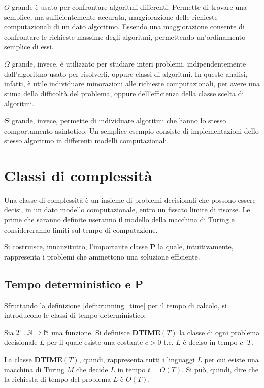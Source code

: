 $O$ grande è usato per confrontare algoritmi differenti.
Permette di trovare una semplice, ma sufficientemente accurata, maggiorazione delle richieste computazionali di un dato algoritmo. 
Essendo una maggiorazione consente di confrontare le richieste massime degli algoritmi, permettendo un'ordinamento semplice di essi.

$\Omega$ grande, invece, è utilizzato per studiare interi problemi, indipendentemente dall'algoritmo usato per risolverli, oppure classi di algoritmi.
In queste analisi, infatti, è utile individuare minorazioni alle richieste computazionali, per avere una stima della difficoltà del problema, oppure dell'efficienza della classe scelta di algoritmi.

$\Theta$ grande, invece, permette di individuare algoritmi che hanno lo stesso comportamento asintotico.
Un semplice esempio consiste di implementazioni dello stesso algoritmo in differenti modelli computazionali.

\section{Classi di complessità}
Una classe di complessità è un insieme di problemi decisionali che possono essere decisi, in un dato modello computazionale, entro un fissato limite di risorse.
Le prime che saranno definite useranno il modello della macchina di Turing e considereranno limiti sul tempo di computazione.

Si costruisce, innanzitutto, l'importante classe \textbf{P} la quale, intuitivamente, rappresenta i problemi che ammettono una soluzione efficiente.
\subsection{Tempo deterministico e P}
Sfruttando la definizione \ref{defn:running_time} per il tempo di calcolo, si introducono le classi di tempo deterministico:
\begin{defn}\label{defn:DTIME}
 Sia $T: \mathbb{N} \to \mathbb{N}$ una funzione.
 Si definisce \textbf{DTIME}$(T)$ la classe di ogni problema decisionale $L$ per il quale esiste una costante $c > 0$ t.c. $L$ è deciso in tempo $c \cdot T$.
\end{defn}
La classe \textbf{DTIME}$(T)$, quindi, rappresenta tutti i linguaggi $L$ per cui esiste una macchina di Turing $M$ che decide $L$ in tempo $t = O(T)$. Si può, quindi, dire che la richiesta di tempo del problema $L$ è $O(T)$.

